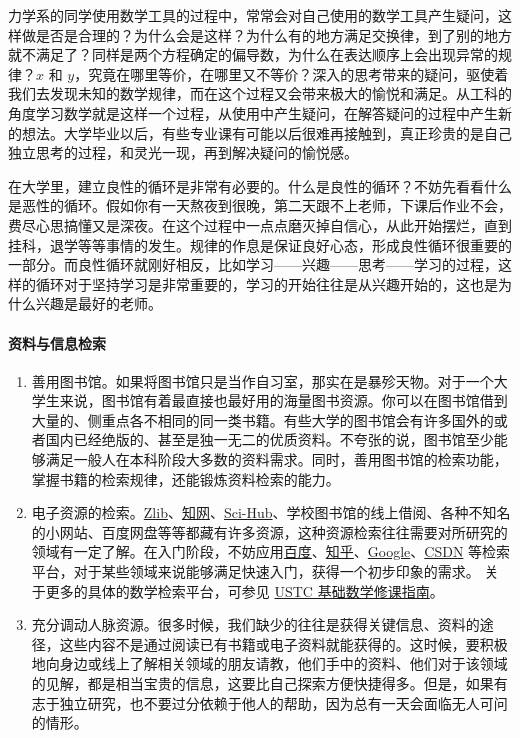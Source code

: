 力学系的同学使用数学工具的过程中，常常会对自己使用的数学工具产生疑问，这样做是否是合理的？为什么会是这样？为什么有的地方满足交换律，到了别的地方就不满足了？同样是两个方程确定的偏导数，为什么在表达顺序上会出现异常的规律？$x$ 和 $y$，究竟在哪里等价，在哪里又不等价？深入的思考带来的疑问，驱使着我们去发现未知的数学规律，而在这个过程又会带来极大的愉悦和满足。从工科的角度学习数学就是这样一个过程，从使用中产生疑问，在解答疑问的过程中产生新的想法。大学毕业以后，有些专业课有可能以后很难再接触到，真正珍贵的是自己独立思考的过程，和灵光一现，再到解决疑问的愉悦感。

在大学里，建立良性的循环是非常有必要的。什么是良性的循环？不妨先看看什么是恶性的循环。假如你有一天熬夜到很晚，第二天跟不上老师，下课后作业不会，费尽心思搞懂又是深夜。在这个过程中一点点磨灭掉自信心，从此开始摆烂，直到挂科，退学等等事情的发生。规律的作息是保证良好心态，形成良性循环很重要的一部分。而良性循环就刚好相反，比如学习——兴趣——思考——学习的过程，这样的循环对于坚持学习是非常重要的，学习的开始往往是从兴趣开始的，这也是为什么兴趣是最好的老师。

\paragraph{资料与信息检索}

\begin{enumerate}
    \item 善用图书馆。如果将图书馆只是当作自习室，那实在是暴殄天物。对于一个大学生来说，图书馆有着最直接也最好用的海量图书资源。你可以在图书馆借到大量的、侧重点各不相同的同一类书籍。有些大学的图书馆会有许多国外的或者国内已经绝版的、甚至是独一无二的优质资料。不夸张的说，图书馆至少能够满足一般人在本科阶段大多数的资料需求。同时，善用图书馆的检索功能，掌握书籍的检索规律，还能锻炼资料检索的能力。
    \item 电子资源的检索。\href{https://zh.wikipedia.org/wiki/Z-Library}{Zlib}、\href{https://www.cnki.net}{知网}、\href{https://www.sci-hub.st}{Sci-Hub}、学校图书馆的线上借阅、各种不知名的小网站、百度网盘等等都藏有许多资源，这种资源检索往往需要对所研究的领域有一定了解。在入门阶段，不妨应用\href{https://www.baidu.com}{百度}、\href{https://www.zhihu.com}{知乎}、\href{https://www.google.com}{Google}、\href{https://www.csdn.net}{CSDN} 等检索平台，对于某些领域来说能够满足快速入门，获得一个初步印象的需求。
          关于更多的具体的数学检索平台，可参见 \href{http://home.ustc.edu.cn/~yx3x/USTC/ustcmathplan3.pdf}{USTC 基础数学修课指南}。
    \item 充分调动人脉资源。很多时候，我们缺少的往往是获得关键信息、资料的途径，这些内容不是通过阅读已有书籍或电子资料就能获得的。这时候，要积极地向身边或线上了解相关领域的朋友请教，他们手中的资料、他们对于该领域的见解，都是相当宝贵的信息，这要比自己探索方便快捷得多。但是，如果有志于独立研究，也不要过分依赖于他人的帮助，因为总有一天会面临无人可问的情形。
\end{enumerate}

